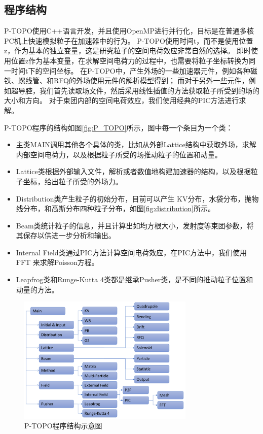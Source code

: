 \subsection{程序结构}
P-TOPO使用C++语言开发，并且使用OpenMP进行并行化，目标是在普通多核PC机上快速模拟粒子在加速器中的行为。
P-TOPO使用时间t，而不是使用位置z，作为基本的独立变量，这是研究粒子的空间电荷效应非常自然的选择。
即时使用位置z作为基本变量，在求解空间电荷力的过程中，也需要将粒子坐标转换为同一时间t下的空间坐标。
在P-TOPO中，产生外场的一些加速器元件，例如各种磁铁、螺线管、和RFQ的外场使用元件的解析模型得到；
而对于另外一些元件，例如超导腔，我们首先读取场文件\cite{studio2008cst}，然后采用线性插值的方法获取粒子所受到的场的大小和方向。
对于束团内部的空间电荷效应，我们使用经典的PIC方法进行求解。

P-TOPO程序的结构如图\eqref{fig:P_TOPO}所示，图中每一个条目为一个类：
\begin{itemize}
  \item 主类MAIN调用其他各个具体的类，比如从外部Lattice结构中获取外场，求解内部空间电荷力，以及根据粒子所受的场推动粒子的位置和动量。
  \item Lattice类根据外部输入文件，解析或者数值地构建加速器的结构，以及根据粒子坐标，给出粒子所受的外场力。
  \item Distribution类产生粒子的初始分布，目前可以产生 KV分布，水袋分布，抛物线分布，和高斯分布四种粒子分布，如图\eqref{fig:distribution}所示。
  \item Beam类统计粒子的信息，并且计算出如均方根大小，发射度等束团参数，将其保存以供进一步分析和输出。
  \item Internal Field类通过PIC方法计算空间电荷效应，在PIC方法中，我们使用FFT 来求解Poisson方程。
  \item Leapfrog类和Runge-Kutta 4类都是继承Pusher类，是不同的推动粒子位置和动量的方法。
\end{itemize}

\begin{figure}[!htb]
    \centering
    \includegraphics[width=0.75\textwidth]{Img/P_TOPO.pdf}
    \caption{P-TOPO程序结构示意图}
    \label{fig:P_TOPO}
\end{figure}


